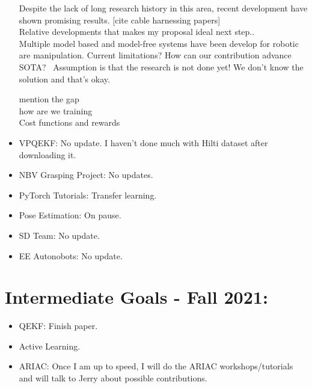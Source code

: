 \documentclass[11pt]{article}
\begin{document}
\begin{itemize}
      \noindent
      Despite the lack of long research history in this area, recent development have shown promising results. [cite cable harnessing papers]\\

      Relative developments that makes my proposal ideal next step..\\

      Multiple model based and model-free systems have been develop for robotic are
      manipulation.
      Current limitations?
      How can our contribution advance SOTA? 
      Assumption is that the research is not done yet! We don’t know the solution and that's okay.

      mention the gap\\
      how are we training\\
      Cost functions and rewards\\

      \item VPQEKF: No update. I haven't done much with Hilti dataset after downloading it.
      \item NBV Grasping Project: No updates.
      \item PyTorch Tutorials: Transfer learning.
      \item Pose Estimation: On pause.
      \item SD Team: No update.
      \item EE Autonobots: No update.
\end{itemize}


\section{Intermediate Goals - Fall 2021:}
\begin{itemize}
      \item QEKF: Finish paper.
      \item Active Learning.
      \item ARIAC: Once I am up to speed, I will do the ARIAC workshops/tutorials and will talk to Jerry about possible contributions.
\end{itemize}


\newpage


\end{document}
